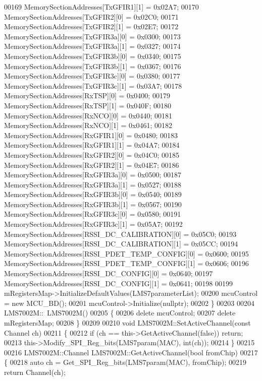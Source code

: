 \begin{DoxyCode}
00169     MemorySectionAddresses[TxGFIR1][1] = 0x02A7;
00170     MemorySectionAddresses[TxGFIR2][0] = 0x02C0;
00171     MemorySectionAddresses[TxGFIR2][1] = 0x02E7;
00172     MemorySectionAddresses[TxGFIR3a][0] = 0x0300;
00173     MemorySectionAddresses[TxGFIR3a][1] = 0x0327;
00174     MemorySectionAddresses[TxGFIR3b][0] = 0x0340;
00175     MemorySectionAddresses[TxGFIR3b][1] = 0x0367;
00176     MemorySectionAddresses[TxGFIR3c][0] = 0x0380;
00177     MemorySectionAddresses[TxGFIR3c][1] = 0x03A7;
00178     MemorySectionAddresses[RxTSP][0] = 0x0400;
00179     MemorySectionAddresses[RxTSP][1] = 0x040F;
00180     MemorySectionAddresses[RxNCO][0] = 0x0440;
00181     MemorySectionAddresses[RxNCO][1] = 0x0461;
00182     MemorySectionAddresses[RxGFIR1][0] = 0x0480;
00183     MemorySectionAddresses[RxGFIR1][1] = 0x04A7;
00184     MemorySectionAddresses[RxGFIR2][0] = 0x04C0;
00185     MemorySectionAddresses[RxGFIR2][1] = 0x04E7;
00186     MemorySectionAddresses[RxGFIR3a][0] = 0x0500;
00187     MemorySectionAddresses[RxGFIR3a][1] = 0x0527;
00188     MemorySectionAddresses[RxGFIR3b][0] = 0x0540;
00189     MemorySectionAddresses[RxGFIR3b][1] = 0x0567;
00190     MemorySectionAddresses[RxGFIR3c][0] = 0x0580;
00191     MemorySectionAddresses[RxGFIR3c][1] = 0x05A7;
00192     MemorySectionAddresses[RSSI_DC_CALIBRATION][0] = 0x05C0;
00193     MemorySectionAddresses[RSSI_DC_CALIBRATION][1] = 0x05CC;
00194     MemorySectionAddresses[RSSI_PDET_TEMP_CONFIG][0] = 0x0600;
00195     MemorySectionAddresses[RSSI_PDET_TEMP_CONFIG][1] = 0x0606;
00196     MemorySectionAddresses[RSSI_DC_CONFIG][0] = 0x0640;
00197     MemorySectionAddresses[RSSI_DC_CONFIG][1] = 0x0641;
00198 
00199     mRegistersMap->InitializeDefaultValues(LMS7parameterList);
00200     mcuControl = \textcolor{keyword}{new} MCU_BD();
00201     mcuControl->Initialize(\textcolor{keyword}{nullptr});
00202 \}
00203 
00204 LMS7002M::~LMS7002M()
00205 \{
00206     \textcolor{keyword}{delete} mcuControl;
00207     \textcolor{keyword}{delete} mRegistersMap;
00208 \}
00209 
00210 \textcolor{keywordtype}{void} LMS7002M::SetActiveChannel(\textcolor{keyword}{const} Channel ch)
00211 \{
00212     \textcolor{keywordflow}{if} (ch == this->GetActiveChannel(\textcolor{keyword}{false})) \textcolor{keywordflow}{return};
00213     this->Modify_SPI_Reg_bits(LMS7param(MAC), \textcolor{keywordtype}{int}(ch));
00214 \}
00215 
00216 LMS7002M::Channel LMS7002M::GetActiveChannel(\textcolor{keywordtype}{bool} fromChip)
00217 \{
00218     \textcolor{keyword}{auto} ch = Get_SPI_Reg_bits(LMS7param(MAC), fromChip);
00219     \textcolor{keywordflow}{return} Channel(ch);

\end{DoxyCode}
